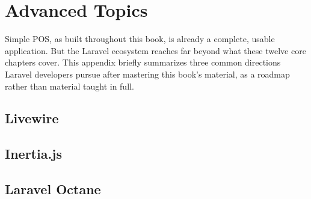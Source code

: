
\chapter{Advanced Topics}
\label{app:topik-lanjutan}

Simple POS, as built throughout this book, is already a complete, usable
application. But the Laravel ecosystem reaches far beyond what these twelve
core chapters cover. This appendix briefly summarizes three common directions
Laravel developers pursue after mastering this book's material, as a roadmap
rather than material taught in full.

\section{Livewire}


\section{Inertia.js}


\section{Laravel Octane}

